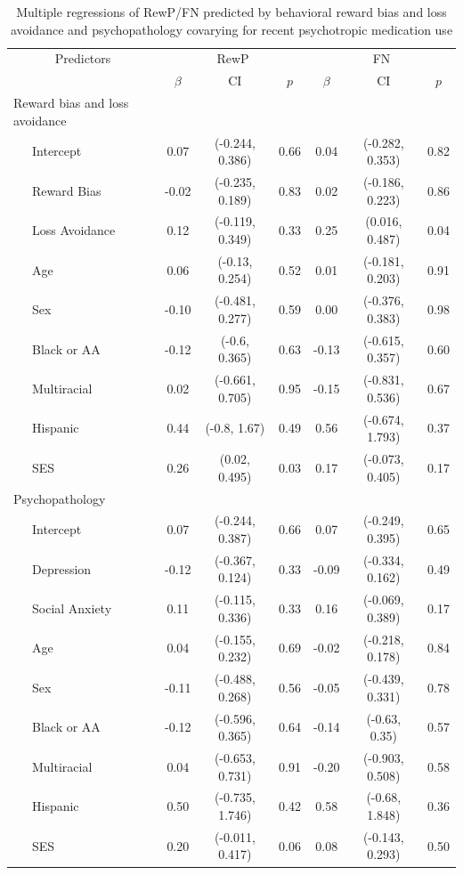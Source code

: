 \documentclass[english,man,floatsintext]{apa6}
\begin{document}
\begin{table}[tbp]

\begin{center}
\begin{threeparttable}

\caption{\label{tab:unnamed-chunk-11}Multiple regressions of RewP/FN predicted by behavioral reward bias and loss avoidance and psychopathology covarying for recent psychotropic medication use}

\begin{tabular}{lcccccc}
\toprule
 \multicolumn{1}{c}{Predictors} & \multicolumn{3}{c}{RewP} & \multicolumn{3}{c}{FN} \\
\cmidrule(r){1-1} \cmidrule(r){2-4} \cmidrule(r){5-7}
  & $\beta$ & CI & $p$ & $\beta$ & CI & $p$\\
\midrule
Reward bias and loss avoidance &  &  &  &  &  & \\
\ \ \ Intercept & 0.07 & (-0.244, 0.386) & 0.66 & 0.04 & (-0.282, 0.353) & 0.82\\
\ \ \ Reward Bias & -0.02 & (-0.235, 0.189) & 0.83 & 0.02 & (-0.186, 0.223) & 0.86\\
\ \ \ Loss Avoidance & 0.12 & (-0.119, 0.349) & 0.33 & 0.25 & (0.016, 0.487) & 0.04\\
\ \ \ Age & 0.06 & (-0.13, 0.254) & 0.52 & 0.01 & (-0.181, 0.203) & 0.91\\
\ \ \ Sex & -0.10 & (-0.481, 0.277) & 0.59 & 0.00 & (-0.376, 0.383) & 0.98\\
\ \ \ Black or AA & -0.12 & (-0.6, 0.365) & 0.63 & -0.13 & (-0.615, 0.357) & 0.60\\
\ \ \ Multiracial & 0.02 & (-0.661, 0.705) & 0.95 & -0.15 & (-0.831, 0.536) & 0.67\\
\ \ \ Hispanic & 0.44 & (-0.8, 1.67) & 0.49 & 0.56 & (-0.674, 1.793) & 0.37\\
\ \ \ SES & 0.26 & (0.02, 0.495) & 0.03 & 0.17 & (-0.073, 0.405) & 0.17\\
Psychopathology &  &  &  &  &  & \\
\ \ \ Intercept & 0.07 & (-0.244, 0.387) & 0.66 & 0.07 & (-0.249, 0.395) & 0.65\\
\ \ \ Depression & -0.12 & (-0.367, 0.124) & 0.33 & -0.09 & (-0.334, 0.162) & 0.49\\
\ \ \ Social Anxiety & 0.11 & (-0.115, 0.336) & 0.33 & 0.16 & (-0.069, 0.389) & 0.17\\
\ \ \ Age & 0.04 & (-0.155, 0.232) & 0.69 & -0.02 & (-0.218, 0.178) & 0.84\\
\ \ \ Sex & -0.11 & (-0.488, 0.268) & 0.56 & -0.05 & (-0.439, 0.331) & 0.78\\
\ \ \ Black or AA & -0.12 & (-0.596, 0.365) & 0.64 & -0.14 & (-0.63, 0.35) & 0.57\\
\ \ \ Multiracial & 0.04 & (-0.653, 0.731) & 0.91 & -0.20 & (-0.903, 0.508) & 0.58\\
\ \ \ Hispanic & 0.50 & (-0.735, 1.746) & 0.42 & 0.58 & (-0.68, 1.848) & 0.36\\
\ \ \ SES & 0.20 & (-0.011, 0.417) & 0.06 & 0.08 & (-0.143, 0.293) & 0.50\\
\bottomrule
\end{tabular}


\end{threeparttable}
\end{center}
\end{table}
\end{document}
